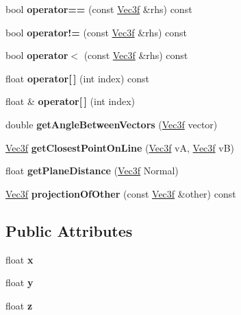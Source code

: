 \begin{DoxyCompactItemize}
\item 
\mbox{\label{struct_vec3f_a709fada166ea2528538b06a81a1faace}} 
bool {\bfseries operator==} (const \hyperlink{struct_vec3f}{Vec3f} \&rhs) const
\item 
\mbox{\label{struct_vec3f_a906e23e9f3a8f904606c0dbaaca3fa5c}} 
bool {\bfseries operator!=} (const \hyperlink{struct_vec3f}{Vec3f} \&rhs) const
\item 
\mbox{\label{struct_vec3f_ad8361bc7ec843adae4c8f98eaeb1b56e}} 
bool {\bfseries operator$<$} (const \hyperlink{struct_vec3f}{Vec3f} \&rhs) const
\item 
\mbox{\label{struct_vec3f_a9ee66365b10ddeb58c89f7ebf0305909}} 
float {\bfseries operator\mbox{[}$\,$\mbox{]}} (int index) const
\item 
\mbox{\label{struct_vec3f_aa0c04f4b27776d3e5127e97a3e249fc9}} 
float \& {\bfseries operator\mbox{[}$\,$\mbox{]}} (int index)
\item 
\mbox{\label{struct_vec3f_a49b84a601c16464ab60b1e04aab26a3e}} 
double {\bfseries get\+Angle\+Between\+Vectors} (\hyperlink{struct_vec3f}{Vec3f} vector)
\item 
\mbox{\label{struct_vec3f_a76e031e807c21315943e4b04b2a01d1c}} 
\hyperlink{struct_vec3f}{Vec3f} {\bfseries get\+Closest\+Point\+On\+Line} (\hyperlink{struct_vec3f}{Vec3f} vA, \hyperlink{struct_vec3f}{Vec3f} vB)
\item 
\mbox{\label{struct_vec3f_a177e94323a1a1478ebf3948b91f5ee0a}} 
float {\bfseries get\+Plane\+Distance} (\hyperlink{struct_vec3f}{Vec3f} Normal)
\item 
\mbox{\label{struct_vec3f_abd51d9850dff2c7382645468f7ca9075}} 
\hyperlink{struct_vec3f}{Vec3f} {\bfseries projection\+Of\+Other} (const \hyperlink{struct_vec3f}{Vec3f} \&other) const
\end{DoxyCompactItemize}
\subsection*{Public Attributes}
\begin{DoxyCompactItemize}
\item 
\mbox{\label{struct_vec3f_a4ee774446db3cafa0f9682065a64ba32}} 
float {\bfseries x}
\item 
\mbox{\label{struct_vec3f_a3b01268bf88a45f95a45097b0457393f}} 
float {\bfseries y}
\item 
\mbox{\label{struct_vec3f_a78f2ea154cc9996ad95397a1fb0f4033}} 
float {\bfseries z}
\end{DoxyCompactItemize}
